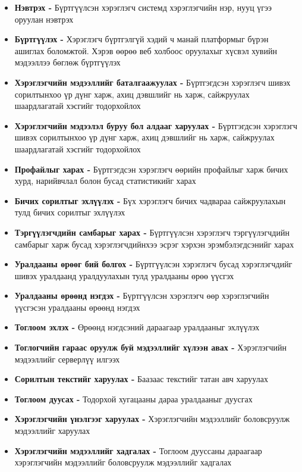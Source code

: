 \begin{itemize}
	\item \textbf{Нэвтрэх -} Бүртгүүлсэн хэрэглэгч системд хэрэглэгчийн нэр, нууц үгээ оруулан нэвтрэх
	\item \textbf{Бүртгүүлэх -} Хэрэглэгч бүртгэлгүй хэдий ч манай платформыг бүрэн ашиглах боломжтой. Хэрэв өөрөө веб холбоос оруулахыг хүсвэл хувийн мэдээллээ бөглөж бүртгүүлэх
	\item \textbf{Хэрэглэгчийн мэдээллийг баталгаажуулах -} Бүртгэгдсэн хэрэглэгч шивэх сорилтынхоо үр дүнг харж, ахиц дэвшлийг нь харж, сайжруулах шаардлагатай хэсгийг тодорхойлох
	\item \textbf{Хэрэглэгчийн мэдээлэл буруу бол алдааг харуулах -} Бүртгэгдсэн хэрэглэгч шивэх сорилтынхоо үр дүнг харж, ахиц дэвшлийг нь харж, сайжруулах шаардлагатай хэсгийг тодорхойлох
	\item \textbf{Профайлыг харах -} Бүртгэгдсэн хэрэглэгч өөрийн профайлыг харж бичих хурд, нарийвчлал болон бусад статистикийг харах
	\item \textbf{Бичих сорилтыг эхлүүлэх -} Бүх хэрэглэгч бичих чадвараа сайжруулахын тулд бичих сорилтыг эхлүүлэх
	\item \textbf{Тэргүүлэгчдийн самбарыг харах -} Бүртгүүлсэн хэрэглэгч тэргүүлэгчдийн самбарыг харж бусад хэрэглэгчдийнхээ эсрэг хэрхэн эрэмбэлэгдсэнийг харах
	\item \textbf{Уралдааны өрөөг бий болгох -} Бүртгүүлсэн хэрэглэгч бусад хэрэглэгчдийг шивэх уралдаанд уралдуулахын тулд уралдааны өрөө үүсгэх
	\item \textbf{Уралдааны өрөөнд нэгдэх -} Бүртгүүлсэн хэрэглэгч өөр хэрэглэгчийн үүсгэсэн уралдааны өрөөнд нэгдэх
	\item \textbf{Тоглоом эхлэх -} Өрөөнд нэгдсэний дараагаар уралдааныг эхлүүлэх
	\item \textbf{Тоглогчийн гараас оруулж буй мэдээллийг хүлээн авах -} Хэрэглэгчийн мэдээллийг серверлүү илгээх
	\item \textbf{Сорилтын текстийг харуулах -} Баазаас текстийг татан авч харуулах
	\item \textbf{Тоглоом дуусах -} Тодорхой хугацааны дараа уралдааныг дуусгах
	\item \textbf{Хэрэглэгчийн  үнэлгээг харуулах -} Хэрэглэгчийн мэдээллийг боловсруулж мэдээллийг харуулах
	\item \textbf{Хэрэглэгчийн мэдээллийг хадгалах -} Тоглоом дууссаны дараагаар хэрэглэгчийн мэдээллийг боловсруулж мэдээллийг хадгалах
\end{itemize}

